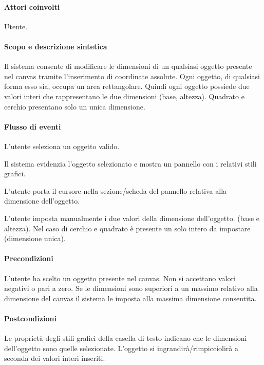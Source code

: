 \paragraph{Attori coinvolti} Utente.
\paragraph{Scopo e descrizione sintetica} Il sistema consente di modificare le dimensioni  di un qualsiasi oggetto presente nel canvas tramite l'inserimento di coordinate assolute.  Ogni oggetto, di qualsiasi forma esso sia, occupa un area rettangolare. Quindi ogni oggetto possiede due valori interi che rappresentano le due dimensioni (base, altezza). Quadrato e cerchio presentano solo un unica dimensione.
\paragraph{Flusso di eventi}
\begin{elenconumerato}[\textbf{}]{\subsubsecindent}
\item  L'utente seleziona un oggetto valido.
\item  Il sistema evidenzia l'oggetto selezionato e mostra un pannello con i relativi stili grafici.
\item  L'utente porta il cursore nella sezione/scheda del pannello relativa alla dimensione dell'oggetto.
\item  L'utente imposta manualmente i due valori della dimensione dell'oggetto.
(base e altezza). Nel caso di cerchio e quadrato  \`e  presente un solo intero da impostare (dimensione unica).
\end{elenconumerato}
\paragraph{Precondizioni} L'utente ha scelto un oggetto presente nel canvas. Non si accettano valori negativi o pari a zero. Se le dimensioni sono superiori a un massimo relativo alla dimensione del canvas il sistema le imposta alla massima dimensione consentita.
\paragraph{Postcondizioni} Le propriet\` a degli stili grafici della casella di testo indicano che le dimensioni dell'oggetto  sono quelle selezionate. L'oggetto si ingrandir\`a/rimpicciolir\`a  a seconda dei valori interi inseriti.
                   
